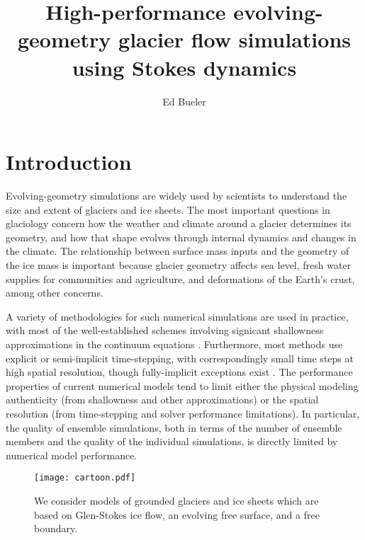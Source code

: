 \documentclass[letterpaper,final,12pt,reqno]{amsart}
\begin{document}
\title[High-performance evolving-geometry glacier flow simulations]{High-performance evolving-geometry glacier flow simulations using Stokes dynamics}

\author{Ed Bueler}

\maketitle

\thispagestyle{empty}
\bigskip

\section{Introduction} \label{sec:intro}

Evolving-geometry simulations are widely used by scientists to understand the size and extent of glaciers and ice sheets.  The most important questions in glaciology concern how the weather and climate around a glacier determines its geometry, and how that shape evolves through internal dynamics and changes in the climate.  The relationship between surface mass inputs and the geometry of the ice mass is important because glacier geometry affects sea level, fresh water supplies for communities and agriculture, and deformations of the Earth's crust, among other concerns.

A variety of methodologies for such numerical simulations are used in practice, with most of the well-established schemes involving signicant shallowness approximations in the continuum equations \cite[for example]{Hoffmanetal2018,Lipscombetal2019,Winkelmannetal2011}.  Furthermore, most methods use explicit or semi-implicit time-stepping, with correspondingly small time steps at high spatial resolution, though fully-implicit exceptions exist \cite{Brinkerhoffetal2017,Bueler2016}.  The performance properties of current numerical models tend to limit either the physical modeling authenticity (from shallowness and other approximations) or the spatial resolution (from time-stepping and solver performance limitations).  In particular, the quality of ensemble simulations, both in terms of the number of ensemble members and the quality of the individual simulations, is directly limited by numerical model performance.

\begin{figure}[h]
\begin{center}
\texttt{[image: cartoon.pdf]}
\end{center}
\caption{We consider models of grounded glaciers and ice sheets which are based on Glen-Stokes ice flow, an evolving free surface, and a free boundary.}
\label{fig:cartoon}
\end{figure}
\end{document}
